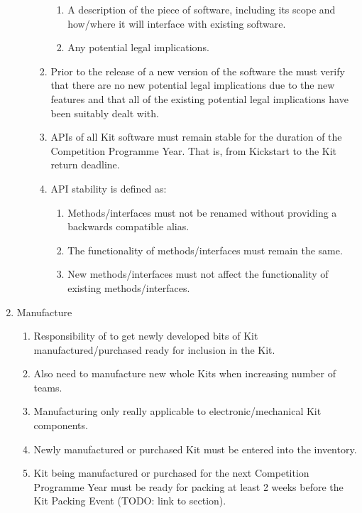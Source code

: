 \begin{draft}
\begin{enumerate}
\begin{enumerate}
\begin{enumerate}
          \begin{enumerate}
            \item A description of the piece of software, including its scope and how/where it will interface with existing software.
            \item Any potential legal implications.
          \end{enumerate}
        \item Prior to the release of a new version of the software the  must verify that there are no new potential legal implications due to the new features and that all of the existing potential legal implications have been suitably dealt with.
        \item APIs of all Kit software must remain stable for the duration of the Competition Programme Year. That is, from Kickstart to the Kit return deadline.
        \item API stability is defined as:
          \begin{enumerate}
            \item Methods/interfaces must not be renamed without providing a backwards compatible alias.
            \item The functionality of methods/interfaces must remain the same.
            \item New methods/interfaces must not affect the functionality of existing methods/interfaces.
          \end{enumerate}
      \end{enumerate}
  \end{enumerate}

\item Manufacture
  \begin{enumerate}
    \item Responsibility of  to get newly developed bits of Kit manufactured/purchased ready for inclusion in the Kit.
    \item Also need to manufacture new whole Kits when increasing number of teams.
    \item Manufacturing only really applicable to electronic/mechanical Kit components.
    \item Newly manufactured or purchased Kit must be entered into the inventory.
    \item Kit being manufactured or purchased for the next Competition Programme Year must be ready for packing at least 2 weeks before the Kit Packing Event (TODO: link to section).
  \end{enumerate}


\end{enumerate}
\end{draft}
